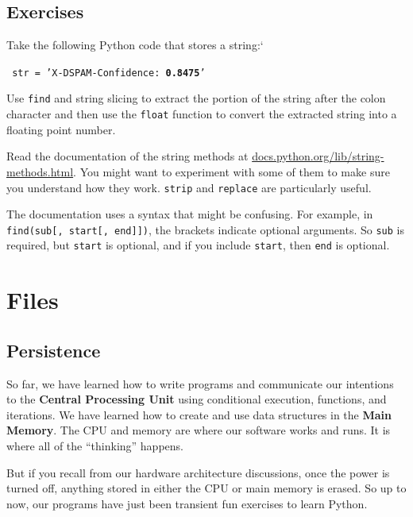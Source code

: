 \documentclass[10pt]{book}
\begin{document}
\section{Exercises}

\begin{ex}
Take the following Python code that stores a string:`

{\tt
str = 'X-DSPAM-Confidence: {\bf 0.8475}'
}

Use {\tt find} and string slicing to extract the portion
of the string after the colon character and then use the 
{\tt float} function to convert the extracted string 
into a floating point number.

\end{ex}


\begin{ex}

Read the documentation of the string methods at
\url{docs.python.org/lib/string-methods.html}.  You
might want to experiment with some of them to make sure
you understand how they work.  {\tt strip} and
{\tt replace} are particularly useful.

The documentation uses a syntax that might be confusing.
For example, in \verb"find(sub[, start[, end]])", the brackets
indicate optional arguments.  So {\tt sub} is required, but
{\tt start} is optional, and if you include {\tt start},
then {\tt end} is optional.
\end{ex}

\chapter{Files}



\section{Persistence}


So far, we have learned how to write programs and communicate 
our intentions to the {\bf Central Processing Unit} using conditional
execution, functions, and iterations.  We have learned how to 
create and use data structures in the {\bf Main Memory}.  The CPU 
and memory are where our software works and runs.  It is where 
all of the ``thinking'' happens.  

But if you recall from our hardware architecture discussions,
once the power is turned off, anything stored in either
the CPU or main memory is erased.  So up to now, our
programs have just been transient fun exercises to learn Python.
\end{document}
